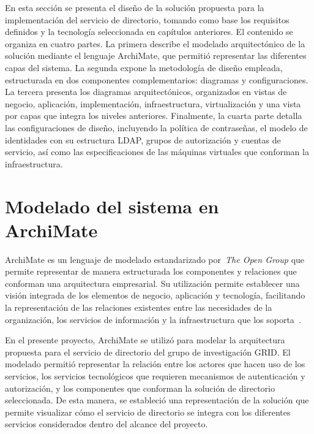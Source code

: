 \label{cap:disenio-solucion}
\vspace*{0.7cm}

En esta sección se presenta el diseño de la solución propuesta para la implementación del servicio de directorio, tomando como base los requisitos definidos y la tecnología seleccionada en capítulos anteriores. El contenido se organiza en cuatro partes. La primera describe el modelado arquitectónico de la solución mediante el lenguaje ArchiMate, que permitió representar las diferentes capas del sistema. La segunda expone la metodología de diseño empleada, estructurada en dos componentes complementarios: diagramas y configuraciones. La tercera presenta los diagramas arquitectónicos, organizados en vistas de negocio, aplicación, implementación, infraestructura, virtualización y una vista por capas que integra los niveles anteriores. Finalmente, la cuarta parte detalla las configuraciones de diseño, incluyendo la política de contraseñas, el modelo de identidades con su estructura LDAP, grupos de autorización y cuentas de servicio, así como las especificaciones de las máquinas virtuales que conforman la infraestructura.

\section{Modelado del sistema en ArchiMate}\label{sec:archimate-modelado}

ArchiMate es un lenguaje de modelado estandarizado por~\textit{The Open Group} que permite representar de manera estructurada los componentes y relaciones que conforman una arquitectura empresarial. Su utilización permite establecer una visión integrada de los elementos de negocio, aplicación y tecnología, facilitando la representación de las relaciones existentes entre las necesidades de la organización, los servicios de información y la infraestructura que los soporta~\citep{opengroup_archimate_overview}.

En el presente proyecto, ArchiMate se utilizó para modelar la arquitectura propuesta para el servicio de directorio del grupo de investigación \ac{GRID}. El modelado permitió representar la relación entre los actores que hacen uso de los servicios, los servicios tecnológicos que requieren mecanismos de autenticación y autorización, y los componentes que conforman la solución de directorio seleccionada. De esta manera, se estableció una representación de la solución que permite visualizar cómo el servicio de directorio se integra con los diferentes servicios considerados dentro del alcance del proyecto.

